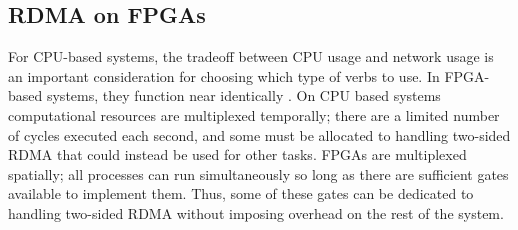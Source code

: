 \subsection{RDMA on FPGAs}

For CPU-based systems, the tradeoff between CPU usage and network usage is an important consideration for choosing which type of verbs to use. In FPGA-based systems, they function near identically \autocite{strom}. On CPU based systems computational resources are multiplexed temporally; there are a limited number of cycles executed each second, and some must be allocated to handling two-sided RDMA that could instead be used for other tasks. FPGAs are multiplexed spatially; all processes can run simultaneously so long as there are sufficient gates available to implement them. Thus, some of these gates can be dedicated to handling two-sided RDMA without imposing overhead on the rest of the system.
